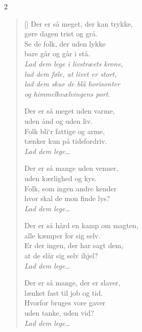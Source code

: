 \begin{multicols}2
\settowidth{\versewidth}{Der er så hård en kamp om magten,}
\begin{verse}[\versewidth]
Der er så meget, der kan trykke,\\
gøre dagen trist og grå.\\
Se de folk, der uden lykke\\
bare går og går i stå.\\
\emph{Lad dem lege i livstræets krone,\\
lad dem føle, at livet er stort,\\
lad dem skue de blå horisonter\\
og himmelhvælvingens port.}

Der er så meget uden varme,\\
uden ånd og uden liv.\\
Folk bli`r fattige og arme,\\
tænker kun på tidsfordriv.\\
\emph{Lad dem lege\ldots}

\columnbreak
Der er så mange uden venner,\\
uden kærlighed og kys.\\
Folk, som ingen andre kender\\
hvor skal de mon finde lys?\\
\emph{Lad dem lege\ldots}

Der er så hård en kamp om magten,\\
alle kæmper for sig selv.\\
Er der ingen, der har sagt dem,\\
at de slår sig selv ihjel?\\
\emph{Lad dem lege\ldots}

Der er så mange, der er slaver,\\
lænket fast til job og tid.\\
Hvorfor bruges vore gaver\\
uden tanke, uden vid?\\
\emph{Lad dem lege\ldots}
\end{verse}
\end{multicols}


\newpage

\phantom{.}\vspace{-1.3cm}

